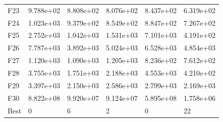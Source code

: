 \begin{tabular}{llllll}
F23  &  9.788e+02 &  8.808e+02 &  8.076e+02 &  8.437e+02 &  6.319e+02 \\
F24  &  1.023e+03 &  9.379e+02 &  8.549e+02 &  8.847e+02 &  7.267e+02 \\
F25  &  2.752e+03 &  1.042e+03 &  1.531e+03 &  7.101e+03 &  4.191e+02 \\
F26  &  7.787e+03 &  3.892e+03 &  5.024e+03 &  6.528e+03 &  4.854e+03 \\
F27  &  1.120e+03 &  1.090e+03 &  1.205e+03 &  8.236e+02 &  7.612e+02 \\
F28  &  3.755e+03 &  1.751e+03 &  2.188e+03 &  4.553e+03 &  4.210e+02 \\
F29  &  3.397e+03 &  2.150e+03 &  2.586e+03 &  2.799e+03 &  2.169e+03 \\
F30  &  8.822e+08 &  9.920e+07 &  9.124e+07 &  5.895e+08 &  1.758e+06 \\
Best &          0 &          6 &          2 &          0 &         22 \\
\bottomrule
\end{tabular}

